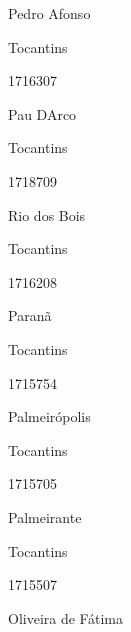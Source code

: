 \documentclass[
  letterpaper,
]{report}
\begin{document}
Pedro Afonso

\n    

\n    

\n      

Tocantins

\n      

1716307

\n      

Pau D\textquotesingle Arco

\n    

\n    

\n      

Tocantins

\n      

1718709

\n      

Rio dos Bois

\n    

\n    

\n      

Tocantins

\n      

1716208

\n      

Paranã

\n    

\n    

\n      

Tocantins

\n      

1715754

\n      

Palmeirópolis

\n    

\n    

\n      

Tocantins

\n      

1715705

\n      

Palmeirante

\n    

\n    

\n      

Tocantins

\n      

1715507

\n      

Oliveira de Fátima

\n    

\n    

\n      
\end{document}
